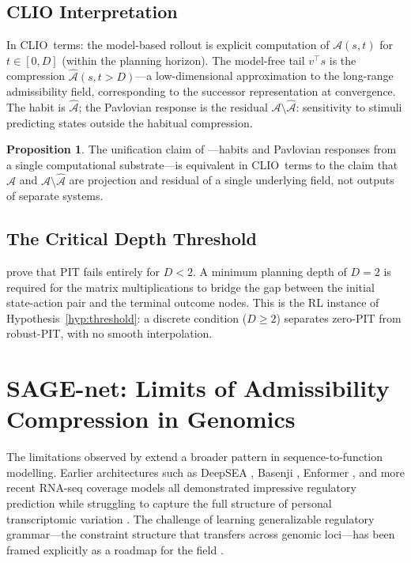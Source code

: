 \documentclass[12pt, a4paper, twoside]{book}
\theoremstyle{definition}
\newtheorem{proposition}{Proposition}[chapter]
\theoremstyle{remark}
\newcommand{\Adm}{\mathcal{A}}
\newcommand{\CLIO}{\textsf{CLIO}}
\begin{document}
\subsection{CLIO Interpretation}

In \CLIO\ terms: the model-based rollout is explicit computation of $\Adm(s,t)$ for $t \in [0,D]$ (within the planning horizon). The model-free tail $v^\top s$ is the compression $\hat{\Adm}(s,t>D)$---a low-dimensional approximation to the long-range admissibility field, corresponding to the successor representation \citep{momennejad2017} at convergence. The habit is $\hat{\Adm}$; the Pavlovian response is the residual $\Adm \setminus \hat{\Adm}$: sensitivity to stimuli predicting states outside the habitual compression.

\begin{proposition}
The unification claim of \citet{okitsu2026}---habits and Pavlovian responses from a single computational substrate---is equivalent in \CLIO\ terms to the claim that $\hat{\Adm}$ and $\Adm \setminus \hat{\Adm}$ are projection and residual of a single underlying field, not outputs of separate systems.
\end{proposition}

\subsection{The Critical Depth Threshold}

\citet{okitsu2026} prove that PIT fails entirely for $D < 2$. A minimum planning depth of $D = 2$ is required for the matrix multiplications to bridge the gap between the initial state-action pair and the terminal outcome nodes. This is the RL instance of Hypothesis~\ref{hyp:threshold}: a discrete condition ($D \geq 2$) separates zero-PIT from robust-PIT, with no smooth interpolation.

\section{SAGE-net: Limits of Admissibility Compression in Genomics}

The limitations observed by \citet{spiro2026} extend a broader pattern in sequence-to-function modelling. Earlier architectures such as DeepSEA \citep{zhou2015}, Basenji \citep{kelley2018}, Enformer \citep{avsec2021}, and more recent RNA-seq coverage models \citep{linder2025} all demonstrated impressive regulatory prediction while struggling to capture the full structure of personal transcriptomic variation \citep{huang2023, sasse2023, karollus2023}. The challenge of learning generalizable regulatory grammar---the constraint structure that transfers across genomic loci---has been framed explicitly as a roadmap for the field \citep{deboer2024}.
\end{document}
